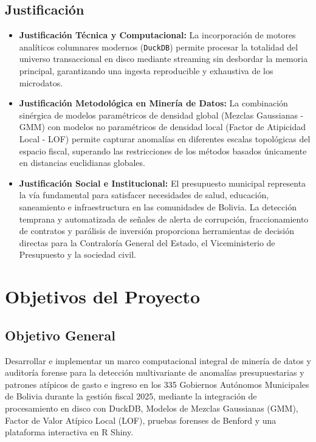\documentclass[11pt,a4paper]{article}
\begin{document}
\subsection{Justificación}
\begin{itemize}[noitemsep]
    \item \textbf{Justificación Técnica y Computacional:} La incorporación de motores analíticos columnares modernos (\texttt{DuckDB}) permite procesar la totalidad del universo transaccional en disco mediante streaming sin desbordar la memoria principal, garantizando una ingesta reproducible y exhaustiva de los microdatos.
    \item \textbf{Justificación Metodológica en Minería de Datos:} La combinación sinérgica de modelos paramétricos de densidad global (Mezclas Gaussianas - GMM) con modelos no paramétricos de densidad local (Factor de Atipicidad Local - LOF) permite capturar anomalías en diferentes escalas topológicas del espacio fiscal, superando las restricciones de los métodos basados únicamente en distancias euclidianas globales.
    \item \textbf{Justificación Social e Institucional:} El presupuesto municipal representa la vía fundamental para satisfacer necesidades de salud, educación, saneamiento e infraestructura en las comunidades de Bolivia. La detección temprana y automatizada de señales de alerta de corrupción, fraccionamiento de contratos y parálisis de inversión proporciona herramientas de decisión directas para la Contraloría General del Estado, el Viceministerio de Presupuesto y la sociedad civil.
\end{itemize}

\section{Objetivos del Proyecto}

\subsection{Objetivo General}
Desarrollar e implementar un marco computacional integral de minería de datos y auditoría forense para la detección multivariante de anomalías presupuestarias y patrones atípicos de gasto e ingreso en los 335 Gobiernos Autónomos Municipales de Bolivia durante la gestión fiscal 2025, mediante la integración de procesamiento en disco con DuckDB, Modelos de Mezclas Gaussianas (GMM), Factor de Valor Atípico Local (LOF), pruebas forenses de Benford y una plataforma interactiva en R Shiny.
\end{document}
